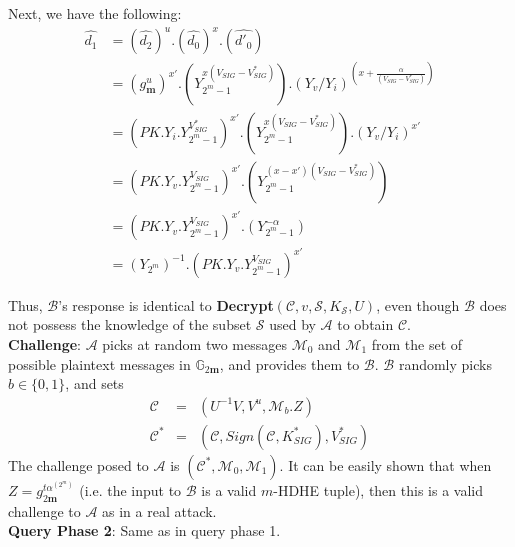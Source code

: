 \noindent Next, we have the following:
\begin{equation}
\begin{split}
  \hat{d_1}&=\left(\hat{d_2}\right)^u.\left(\hat{d_0}\right)^x.\left(\hat{d'_0}\right)\\
  &=\left(g^{u}_{\mathbf{m}}\right)^{x'}.\left(Y^{x\left(V_{SIG}-V^{*}_{SIG}\right)}_{2^m-1}\right).\left(Y_{v}/Y_{i}\right)^{\left(x+\frac{\alpha}{(V_{SIG}-V^{*}_{SIG})}\right)}\\
  &= \left(PK.Y_i.Y^{V^{*}_{SIG}}_{2^m-1}\right)^{x'}.\left(Y^{x\left(V_{SIG}-V^{*}_{SIG}\right)}_{2^m-1}\right).\left(Y_{v}/Y_{i}\right)^{x'}\\
  &= \left(PK.Y_v.Y^{V_{SIG}}_{2^m-1}\right)^{x'}.\left(Y^{\left(x-x'\right)\left(V_{SIG}-V^{*}_{SIG}\right)}_{2^m-1}\right)\\
  &= \left(PK.Y_v.Y^{V_{SIG}}_{2^m-1}\right)^{x'}.\left(Y^{-\alpha}_{2^m-1}\right)\\
  &= \left({Y_{2^m}}\right)^{-1}.\left(PK.Y_v.Y^{V_{SIG}}_{2^m-1}\right)^{x'}\nonumber
\end{split}
\end{equation}
 

\noindent Thus, $\mathcal{B}$'s response is identical to \textbf{Decrypt}$(\mathcal{C},v,\mathcal{S},K_{\mathcal{S}},U)$, even though $\mathcal{B}$ does not possess the knowledge of the subset $\mathcal{S}$ used by $\mathcal{A}$ to obtain $\mathcal{C}$.\\
 
\noindent \textbf{Challenge}: $\mathcal{A}$ picks at random two messages $\mathcal{M}_0$ and $\mathcal{M}_1$ from the set of possible plaintext messages in $\mathbb{G}_{2\mathbf{m}}$, and provides them to $\mathcal{B}$. $\mathcal{B}$ randomly picks $b\in\{0,1\}$, and sets 
\begin{eqnarray}
 \mathcal{C}&=&(U^{-1}V,V^u,\mathcal{M}_b.Z) \nonumber\\
 \mathcal{C}^{*}&=&(\mathcal{C},Sign(\mathcal{C},K^{*}_{SIG}),V^{*}_{SIG})\nonumber
\end{eqnarray}
\noindent The challenge posed to $\mathcal{A}$ is $(\mathcal{C}^{*},\mathcal{M}_0,\mathcal{M}_1)$. It can be easily shown that when $Z=g^{t\alpha^{(2^m)}}_{2\mathbf{m}}$ (i.e. the input to $\mathcal{B}$ is a valid $m$-HDHE tuple), then this is a valid challenge to $\mathcal{A}$ as in a real attack.\\

\noindent\textbf{Query Phase 2}: Same as in query phase 1.\\
 
